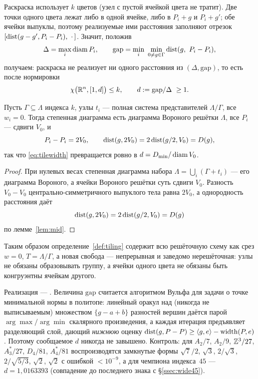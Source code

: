 Раскраска использует $k$ цветов (узел с пустой ячейкой цвета не тратит). Две
точки одного цвета лежат либо в одной ячейке, либо в $P_i+g$ и $P_i+g'$; обе
ячейки выпуклы, поэтому реализуемые ими расстояния заполняют отрезок
$[\operatorname{dist}(g-g',P_i-P_i),\ \cdot\,]$. Значит, положив
\[
\Delta=\max_i\operatorname{diam} P_i,\qquad
\mathrm{gap}=\min_i\ \min_{0\ne g\in\Gamma}\operatorname{dist}(g,\ P_i-P_i),
\]
получаем: раскраска не реализует ни одного расстояния из $(\Delta,\mathrm{gap})$,
то есть после нормировки
\begin{equation}\label{eq:tilewidth}
\chi\bigl(\mathbb{R}^n,[1,d]\bigr)\le k,\qquad d:=\mathrm{gap}/\Delta\ \ge 1 .
\end{equation}

\begin{proposition}\label{prop:contains}
Пусть $\Gamma\subseteq\Lambda$ индекса $k$, узлы $t_i$ --- полная система
представителей $\Lambda/\Gamma$, все $w_i=0$. Тогда степенная диаграмма есть
диаграмма Вороного решётки $\Lambda$, все $P_i$ --- сдвиги $V_0$, и
\[
P_i-P_i=2V_0,\qquad \operatorname{dist}(g,2V_0)=2\operatorname{dist}(g/2,V_0)=D(g),
\]
так что \eqref{eq:tilewidth} превращается ровно в $d=D_{\min}/\operatorname{diam} V_0$.
\end{proposition}

\begin{proof}
При нулевых весах степенная диаграмма набора $\Lambda=\bigcup_i(\Gamma+t_i)$
--- его диаграмма Вороного, а ячейки Вороного решётки суть сдвиги $V_0$.
Разность $V_0-V_0$ центрально-симметричного выпуклого тела равна $2V_0$, а
однородность расстояния даёт
\[
\operatorname{dist}(g,2V_0)=2\operatorname{dist}(g/2,V_0)=D(g)
\]
по лемме~\ref{lem:mid}.
\end{proof}

Таким образом определение~\ref{def:tiling} содержит всю решёточную схему как
срез $w=0$, $T=\Lambda/\Gamma$, а новая свобода --- непрерывная и заведомо
нерешёточная: узлы не обязаны образовывать группу, а ячейки одного цвета не
обязаны быть конгруэнтны ячейкам другого.

Реализация ---
. Величина
$\mathrm{gap}$
считается алгоритмом Вульфа для задачи о точке минимальной нормы в политопе: линейный
оракул над (никогда не выписываемым) множеством $\{g-a+b\}$ разностей вершин
даётся парой $\arg\max/\arg\min$ скалярного произведения, а каждая итерация
предъявляет разделяющий слой, дающий \emph{нижнюю} оценку
$\operatorname{dist}(g,P-P)\ge\langle g,e\rangle-\operatorname{width}(P,e)$. Поэтому
сообщаемое $d$ никогда не завышено. Контроль: для
$A_2/7$, $A_2/9$, $\mathbb{Z}^3/27$, $A_3^*/27$, $D_4/81$, $A_4^*/81$ воспроизводятся
замкнутые формы $\sqrt7/2$, $\sqrt3$, $2/\sqrt3$, $2/\sqrt{5/3}$, $\sqrt2$,
$\sqrt2$ с ошибкой $<10^{-9}$, а для чемпиона индекса~$45$ --- $d=1{,}0163393$
(совпадение до последнего знака с \S\ref{ssec:wide45}).


